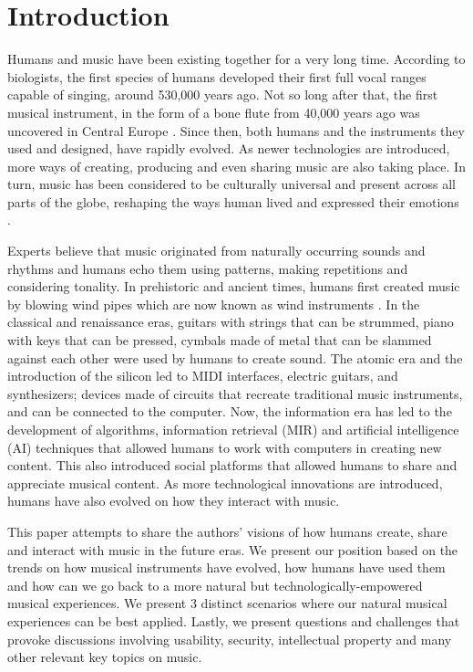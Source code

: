 \documentclass[acmtog]{acmart}
\begin{document}
\section{Introduction}
Humans and music have been existing together for a very long time. According to biologists, the first species of humans developed their first full vocal ranges capable of singing, around 530,000 years ago. Not so long after that, the first musical instrument, in the form of a bone flute from 40,000 years ago was uncovered in Central Europe \cite{higham2012tauesting}. Since then, both humans and the instruments they used and designed, have rapidly evolved. As newer technologies are introduced, more ways of creating, producing and even sharing music \cite{voida2005listening} are also taking place. In turn, music has been considered to be culturally universal \cite{campbell1997music, seeger1971reflections} and present across all parts of the globe, reshaping the ways human lived and expressed their emotions \cite{juslin2001music}.

Experts believe that music originated from naturally occurring sounds and rhythms and humans echo them using patterns, making repetitions and considering tonality. In prehistoric and ancient times, humans first created music by blowing wind pipes which are now known as wind instruments \cite{conard2009female}. In the classical and renaissance eras, guitars with strings that can be strummed, piano with keys that can be pressed, cymbals made of metal that can be slammed against each other were used by humans to create sound. The atomic era and the introduction of the silicon led to MIDI interfaces, electric guitars, and synthesizers; devices made of circuits that recreate traditional music instruments, and can be connected to the computer. Now, the information era has led to the development of algorithms, information retrieval (MIR) and artificial intelligence (AI) techniques that allowed humans to work with computers in creating new content. This also introduced social platforms that allowed humans to share and appreciate musical content. As more technological innovations are introduced, humans have also evolved on how they interact with music. 

This paper attempts to share the authors' visions of how humans create, share and interact with music in the future eras. We present our position based on the trends on how musical instruments have evolved, how humans have used them and how can we go back to a more natural but technologically-empowered musical experiences. We present 3 distinct scenarios where our natural musical experiences can be best applied. Lastly, we present questions and challenges that provoke discussions involving usability, security, intellectual property and many other relevant key topics on music. 
\end{document}
